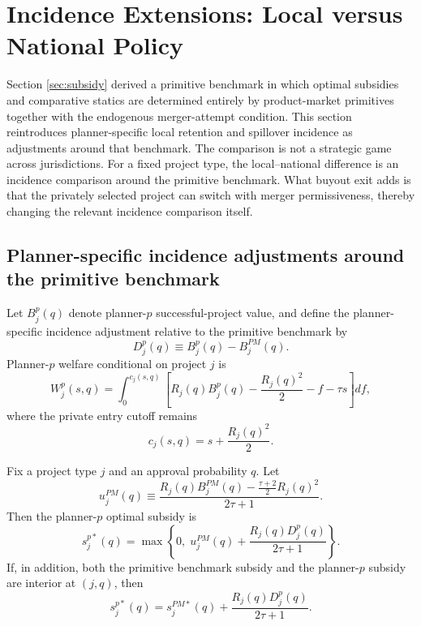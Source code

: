 \section{Incidence Extensions: Local versus National Policy}\label{sec:decentralized}

Section \ref{sec:subsidy} derived a primitive benchmark in which optimal subsidies and comparative statics are determined entirely by product-market primitives together with the endogenous merger-attempt condition. This section reintroduces planner-specific local retention and spillover incidence as adjustments around that benchmark. The comparison is not a strategic game across jurisdictions. For a fixed project type, the local--national difference is an incidence comparison around the primitive benchmark. What buyout exit adds is that the privately selected project can switch with merger permissiveness, thereby changing the relevant incidence comparison itself.

\subsection{Planner-specific incidence adjustments around the primitive benchmark}

Let $B_j^p(q)$ denote planner-$p$ successful-project value, and define the planner-specific incidence adjustment relative to the primitive benchmark by
\begin{equation}\label{eq:Djp}
    D_j^p(q)\equiv B_j^p(q)-B_j^{PM}(q).
\end{equation}
Planner-$p$ welfare conditional on project $j$ is
\begin{equation}\label{eq:Wjp}
    W_j^p(s,q)
    =
    \int_0^{c_j(s,q)}
    \left[
        R_j(q)B_j^p(q)-\frac{R_j(q)^2}{2}-f-\tau s
    \right]df,
\end{equation}
where the private entry cutoff remains
\begin{equation}
    c_j(s,q)=s+\frac{R_j(q)^2}{2}.
\end{equation}

\begin{proposition}\label{prop:incidencedecomp}
Fix a project type $j$ and an approval probability $q$. Let
\begin{equation}\label{eq:uPM}
    u_j^{PM}(q)
    \equiv
    \frac{
        R_j(q)B_j^{PM}(q)-\frac{\tau+2}{2}R_j(q)^2
    }{2\tau+1}.
\end{equation}
Then the planner-$p$ optimal subsidy is
\begin{equation}\label{eq:incidencedecomp}
    s_j^{p*}(q)
    =
    \max\left\{
        0,\;
        u_j^{PM}(q)+\frac{R_j(q)D_j^p(q)}{2\tau+1}
    \right\}.
\end{equation}
If, in addition, both the primitive benchmark subsidy and the planner-$p$ subsidy are interior at $(j,q)$, then
\begin{equation}\label{eq:incidencedecompinterior}
    s_j^{p*}(q)
    =
    s_j^{PM*}(q)
    +
    \frac{R_j(q)D_j^p(q)}{2\tau+1}.
\end{equation}
\end{proposition}

